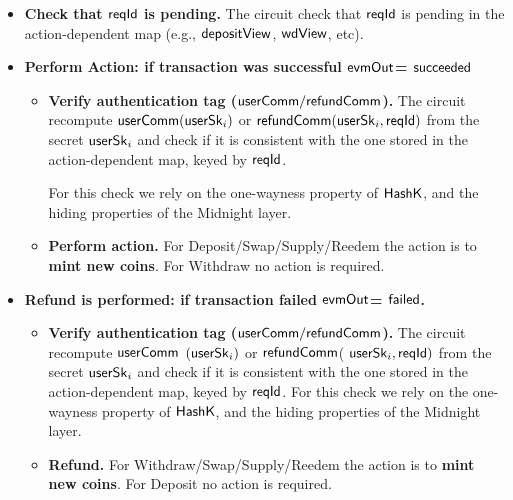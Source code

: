 \begin{enumerate}
\begin{itemize}[label=\small$\blacksquare$]
    For this check we use the unforgeability of ECDSA (in the pre-signature and additive-key derivation  setting) and the collision-resistance properties of $\Kec$.
        \item \textbf{Check that $\mathsf{reqId}$ is pending.} The circuit check that $\mathsf{reqId}$ is pending in the action-dependent map (e.g.,  $\mathsf{depositView}$, $\mathsf{wdView}$, etc).

        \item \textbf{Perform Action: if transaction was successful $\mathsf{evmOut}$= $\mathsf{succeeded}$}
        \begin{itemize}[label=\small$\square$]
             \item \textbf{Verify authentication tag ($\mathsf{userComm}/\mathsf{refundComm}$).} The circuit recompute $\mathsf{userComm}(\mathsf{userSk}_i)$ or $\mathsf{refundComm}(\mathsf{userSk}_i,\mathsf{reqId})$ from the secret $\mathsf{userSk}_i$ and check if it is consistent with the one stored in the action-dependent map, keyed by $\mathsf{reqId}$.

             For this check we rely on the one-wayness property of $\mathsf{HashK}$, and the hiding properties of the  Midnight layer.
             \item \textbf{Perform action.} For Deposit/Swap/Supply/Reedem the action is to  \textbf{mint new coins}. For Withdraw no action is required.
       \end{itemize}
 \item \textbf{Refund is performed: if transaction failed $\mathsf{evmOut}$= $\mathsf{failed}$.}
      \begin{itemize}[label=\small$\square$]
       \item \textbf{Verify authentication tag ($\mathsf{userComm}/\mathsf{refundComm}$).} The circuit recompute $\mathsf{userComm}$ $(\mathsf{userSk}_i)$ or $\mathsf{refundComm}$( $\mathsf{userSk}_i,\mathsf{reqId})$ from the secret $\mathsf{userSk}_i$ and check if it is consistent with the one stored in the action-dependent map, keyed by $\mathsf{reqId}$.
        For this check we rely on the one-wayness property of $\mathsf{HashK}$, and the hiding properties of the  Midnight layer.

        \item \textbf{Refund.} For Withdraw/Swap/Supply/Reedem the action is to  \textbf{mint new coins}. For Deposit no action is required.
        \end{itemize}
    \end{itemize}
\end{enumerate}


